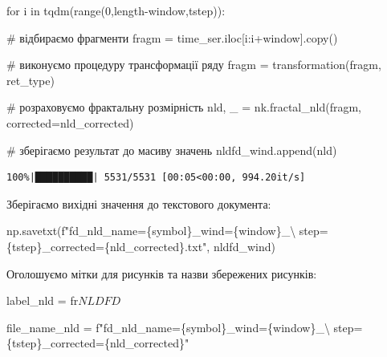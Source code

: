 \documentclass[
  letterpaper,
]{report}
\newenvironment{Shaded}{\begin{snugshade}}{\end{snugshade}}
\newcommand{\BuiltInTok}[1]{\textcolor[rgb]{0.00,0.23,0.31}{#1}}
\newcommand{\CharTok}[1]{\textcolor[rgb]{0.13,0.47,0.30}{#1}}
\newcommand{\CommentTok}[1]{\textcolor[rgb]{0.37,0.37,0.37}{#1}}
\newcommand{\ControlFlowTok}[1]{\textcolor[rgb]{0.00,0.23,0.31}{#1}}
\newcommand{\DecValTok}[1]{\textcolor[rgb]{0.68,0.00,0.00}{#1}}
\newcommand{\KeywordTok}[1]{\textcolor[rgb]{0.00,0.23,0.31}{#1}}
\newcommand{\NormalTok}[1]{\textcolor[rgb]{0.00,0.23,0.31}{#1}}
\newcommand{\OperatorTok}[1]{\textcolor[rgb]{0.37,0.37,0.37}{#1}}
\newcommand{\SpecialCharTok}[1]{\textcolor[rgb]{0.37,0.37,0.37}{#1}}
\newcommand{\SpecialStringTok}[1]{\textcolor[rgb]{0.13,0.47,0.30}{#1}}
\newcommand{\VerbatimStringTok}[1]{\textcolor[rgb]{0.13,0.47,0.30}{#1}}
\begin{document}
\begin{Shaded}
\begin{Highlighting}[]
\ControlFlowTok{for}\NormalTok{ i }\KeywordTok{in}\NormalTok{ tqdm(}\BuiltInTok{range}\NormalTok{(}\DecValTok{0}\NormalTok{,length}\OperatorTok{{-}}\NormalTok{window,tstep)):}
    
    \CommentTok{\# відбираємо фрагменти}
\NormalTok{    fragm }\OperatorTok{=}\NormalTok{ time\_ser.iloc[i:i}\OperatorTok{+}\NormalTok{window].copy()  }

    \CommentTok{\# виконуємо процедуру трансформації ряду }
\NormalTok{    fragm }\OperatorTok{=}\NormalTok{ transformation(fragm, ret\_type)}

    \CommentTok{\# розраховуємо фрактальну розмірність }
\NormalTok{    nld, \_ }\OperatorTok{=}\NormalTok{ nk.fractal\_nld(fragm, }
\NormalTok{                            corrected}\OperatorTok{=}\NormalTok{nld\_corrected)}

    \CommentTok{\# зберігаємо результат до масиву значень}
\NormalTok{    nldfd\_wind.append(nld)}
\end{Highlighting}
\end{Shaded}

\begin{verbatim}
100%|██████████| 5531/5531 [00:05<00:00, 994.20it/s] 
\end{verbatim}

Зберігаємо вихідні значення до текстового документа:

\begin{Shaded}
\begin{Highlighting}[]
\NormalTok{np.savetxt(}\SpecialStringTok{f"fd\_nld\_name=}\SpecialCharTok{\{}\NormalTok{symbol}\SpecialCharTok{\}}\SpecialStringTok{\_wind=}\SpecialCharTok{\{}\NormalTok{window}\SpecialCharTok{\}}\SpecialStringTok{\_}\CharTok{\textbackslash{}}
\SpecialStringTok{           step=}\SpecialCharTok{\{}\NormalTok{tstep}\SpecialCharTok{\}}\SpecialStringTok{\_corrected=}\SpecialCharTok{\{}\NormalTok{nld\_corrected}\SpecialCharTok{\}}\SpecialStringTok{.txt"}\NormalTok{, nldfd\_wind)}
\end{Highlighting}
\end{Shaded}

Оголошуємо мітки для рисунків та назви збережених рисунків:

\begin{Shaded}
\begin{Highlighting}[]
\NormalTok{label\_nld }\OperatorTok{=} \VerbatimStringTok{fr\textquotesingle{}$NLDFD$\textquotesingle{}}

\NormalTok{file\_name\_nld }\OperatorTok{=} \SpecialStringTok{f"fd\_nld\_name=}\SpecialCharTok{\{}\NormalTok{symbol}\SpecialCharTok{\}}\SpecialStringTok{\_wind=}\SpecialCharTok{\{}\NormalTok{window}\SpecialCharTok{\}}\SpecialStringTok{\_}\CharTok{\textbackslash{}}
\SpecialStringTok{                step=}\SpecialCharTok{\{}\NormalTok{tstep}\SpecialCharTok{\}}\SpecialStringTok{\_corrected=}\SpecialCharTok{\{}\NormalTok{nld\_corrected}\SpecialCharTok{\}}\SpecialStringTok{"}
\end{Highlighting}
\end{Shaded}
\end{document}
